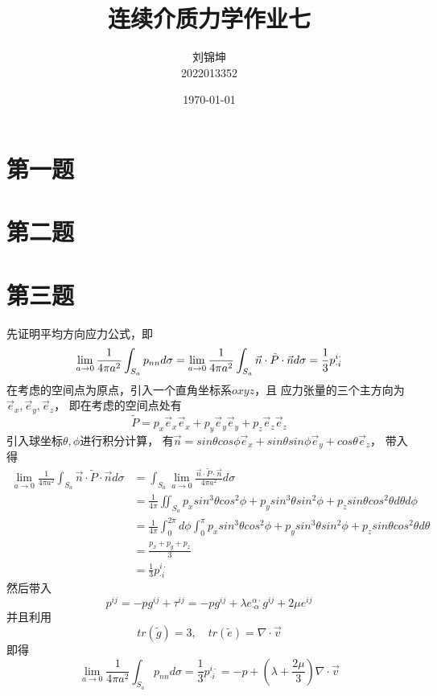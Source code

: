 \documentclass[UTF8]{ctexart}
\title{连续介质力学作业七}
\author{刘锦坤\\2022013352}
\date{\today}
\begin{document}
\maketitle

\section{第一题}

\section{第二题}

\section{第三题}

先证明平均方向应力公式，即
\begin{equation*}
    \lim_{a\to 0}\frac{1}{4\pi a^2}\int_{S_a} p_{nn} d\sigma
    =\lim_{a\to 0}\frac{1}{4\pi a^2}\int_{S_a} \vec n \cdot \tilde P \cdot \vec n d\sigma
    =\frac{1}{3}p^{i\cdot}_{\cdot i}
    \notag
\end{equation*}
在考虑的空间点为原点，引入一个直角坐标系$oxyz$，且
应力张量的三个主方向为$\vec e_x,\vec e_y,\vec e_z$，
即在考虑的空间点处有
\begin{equation*}
    \tilde P=p_x \vec e_x \vec e_x + p_y \vec e_y \vec e_y + p_z \vec e_z \vec e_z
\end{equation*}
引入球坐标$\theta,\phi$进行积分计算，
有$\vec n = sin\theta cos\phi \vec e_x+ sin\theta sin\phi \vec e_y +cos\theta \vec e_z$，
带入得
\begin{align*}
    \lim_{a\to 0}\frac{1}{4\pi a^2}\int_{S_a} \vec n \cdot \tilde P \cdot \vec n d\sigma
    &=\int_{S_a} \lim_{a\to 0}\frac{\vec n \cdot \tilde P \cdot \vec n}{4\pi a^2} d\sigma\\
    &=\frac{1}{4\pi } \iint_{S_a} p_x sin^3\theta cos^2\phi + p_y sin^3\theta sin^2\phi + p_z sin\theta cos^2\theta d\theta d\phi\\
    &=\frac{1}{4\pi } \int_{0}^{2\pi} d\phi \int_{0}^{\pi} p_x sin^3\theta cos^2\phi + p_y sin^3\theta sin^2\phi + p_z sin\theta cos^2\theta d\theta \\
    &=\frac{p_x+p_y+p_z}{3}\\
    &=\frac{1}{3}p^{i\cdot}_{\cdot i}
\end{align*}
然后带入
\begin{equation*}
    p^{ij}=-pg^{ij}+\tau ^{ij}
    =-pg^{ij}+\lambda e^{\alpha\cdot}_{\cdot \alpha} g^{ij} +2 \mu e^{ij}
\end{equation*}
并且利用
\begin{equation*}
    tr(\tilde g)=3,\quad tr(\tilde e)=\nabla \cdot \vec v
\end{equation*}
即得
\begin{equation*}
    \lim_{a\to 0}\frac{1}{4\pi a^2}\int_{S_a} p_{nn} d\sigma
    =\frac{1}{3}p^{i\cdot}_{\cdot i}=-p+(\lambda + \frac{2\mu}{3})\nabla \cdot \vec v
\end{equation*}
\end{document}
